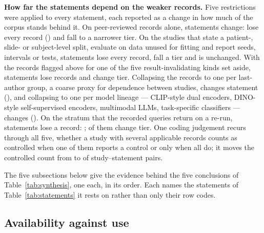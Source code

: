 \textbf{How far the statements depend on the weaker records.} Five restrictions were applied to every
statement, each reported as a change in how much of the corpus stands behind it. On peer-reviewed records
alone, \Fsensrefn{} statements change: \Fsensrefemptyn{} lose every record (\Fsensrefempty{}) and
\Fsensreffalln{} fall to a narrower tier. On the \Nminvalid{} studies that state a patient-, slide- or
subject-level split, evaluate on data unused for fitting and report seeds, intervals or tests,
\Fsensminemptyn{} statements lose every record, \Fsensminfalln{} fall a tier and \Fsensminkeep{} is
unchanged. With the records flagged above for one of the five result-invalidating kinds set aside,
\Fscrdrop{} statements lose records and \Fscrtier{} change tier. Collapsing the records to one per
last-author group, a coarse proxy for dependence between studies, changes \Fsenslastn{} statement
(\Fsenslast{}), and collapsing to one per model lineage --- CLIP-style dual encoders, DINO-style
self-supervised encoders, multimodal LLMs, task-specific classifiers --- changes \Fsenslinn{}
(\Fsenslin{}). On the stratum that the recorded queries return on a re-run, \Frepdrop{} statements lose a
record: \Frepdetail{}; \Freptier{} of them change tier. One coding judgement recurs through all five, whether
a study with several applicable records counts as controlled when one of them reports a control or only
when all do; it moves the controlled count from \Fattribany{} to \Fattribcons{} of \Fattribstud{}
study--statement pairs.



The five subsections below give the evidence behind the five conclusions of
Table~\ref{tab:synthesis}, one each, in its order. Each names the statements of
Table~\ref{tab:statements} it rests on rather than only their row codes.

\subsection{Availability against use}

